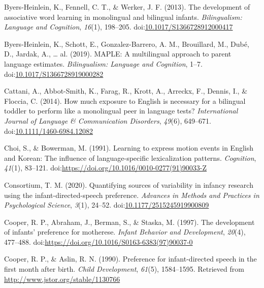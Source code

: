 \documentclass[,man,floatsintext]{apa6}
\begin{document}
\leavevmode\hypertarget{ref-byers_heinlein_2013}{}%
Byers-Heinlein, K., Fennell, C. T., \& Werker, J. F. (2013). The development of associative word learning in monolingual and bilingual infants. \emph{Bilingualism: Language and Cognition}, \emph{16}(1), 198--205. doi:\href{https://doi.org/10.1017/S1366728912000417}{10.1017/S1366728912000417}

\leavevmode\hypertarget{ref-byers_heinlein_2019}{}%
Byers-Heinlein, K., Schott, E., Gonzalez-Barrero, A. M., Brouillard, M., Dubé, D., Jardak, A., \ldots{} al. (2019). MAPLE: A multilingual approach to parent language estimates. \emph{Bilingualism: Language and Cognition}, 1--7. doi:\href{https://doi.org/10.1017/S1366728919000282}{10.1017/S1366728919000282}

\leavevmode\hypertarget{ref-cattani_2014}{}%
Cattani, A., Abbot-Smith, K., Farag, R., Krott, A., Arreckx, F., Dennis, I., \& Floccia, C. (2014). How much exposure to English is necessary for a bilingual toddler to perform like a monolingual peer in language tests? \emph{International Journal of Language \& Communication Disorders}, \emph{49}(6), 649--671. doi:\href{https://doi.org/10.1111/1460-6984.12082}{10.1111/1460-6984.12082}

\leavevmode\hypertarget{ref-choi_1991}{}%
Choi, S., \& Bowerman, M. (1991). Learning to express motion events in English and Korean: The influence of language-specific lexicalization patterns. \emph{Cognition}, \emph{41}(1), 83--121. doi:\href{https://doi.org/https://doi.org/10.1016/0010-0277(91)90033-Z}{https://doi.org/10.1016/0010-0277(91)90033-Z}

\leavevmode\hypertarget{ref-manybabies_consortium_2020}{}%
Consortium, T. M. (2020). Quantifying sources of variability in infancy research using the infant-directed-speech preference. \emph{Advances in Methods and Practices in Psychological Science}, \emph{3}(1), 24--52. doi:\href{https://doi.org/10.1177/2515245919900809}{10.1177/2515245919900809}

\leavevmode\hypertarget{ref-cooper_1997}{}%
Cooper, R. P., Abraham, J., Berman, S., \& Staska, M. (1997). The development of infants' preference for motherese. \emph{Infant Behavior and Development}, \emph{20}(4), 477--488. doi:\href{https://doi.org/https://doi.org/10.1016/S0163-6383(97)90037-0}{https://doi.org/10.1016/S0163-6383(97)90037-0}

\leavevmode\hypertarget{ref-cooper_1990}{}%
Cooper, R. P., \& Aslin, R. N. (1990). Preference for infant-directed speech in the first month after birth. \emph{Child Development}, \emph{61}(5), 1584--1595. Retrieved from \url{http://www.jstor.org/stable/1130766}
\end{document}
